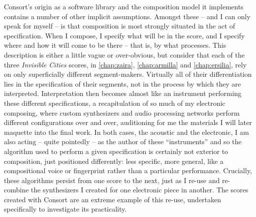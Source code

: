 Consort's origin as a software library and the composition model it implements
contains a number of other implicit assumptions. Amongst these -- and
I can only speak for myself -- is that composition is most strongly situated in
the act of specification. When I compose, I specify what will be in the score,
and I specify where and how it will come to be there -- that is, by what
processes. This description is either a little vague or over-obvious, but
consider that each of the three \emph{Invisible Cities} scores, in
\autoref{chap:zaira}, \autoref{chap:armilla} and \autoref{chap:ersilia}, rely
on only superficially different segment-makers. Virtually all of their
differentiation lies in the specification of their segments, not in the process
by which they are interpreted. Interpretation then becomes almost like an
instrument performing these different specifications, a recapitulation of so
much of my electronic composing, where custom synthesizers and audio processing
networks perform different configurations over and over, auditioning for me the
materials I will later maquette into the final work. In both cases, the
acoustic and the electronic, I am also acting -- quite pointedly -- as the
author of these \enquote{instruments} and so the algorithm used to perform a
given specification is certainly not exterior to composition, just positioned
differently: less specific, more general, like a compositional voice or
fingerprint rather than a particular performance. Crucially, these algorithms
persist from one score to the next, just as I re-use and re-combine the
synthesizers I created for one electronic piece in another. The scores created
with Consort are an extreme example of this re-use, undertaken specifically to
investigate its practicality.

